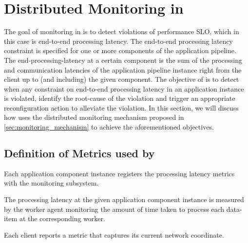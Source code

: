 \section{Distributed Monitoring in \oneedge{}}
\label{sec:oneedge_dist_mon}
The goal of monitoring in \oneedge{} is to detect violations of performance SLO, which in this case is end-to-end processing latency. The end-to-end processing latency constraint is specified for one or more components of the application pipeline. The end-processing-latency at a certain component is the sum of the processing and communication latencies of the application pipeline instance right from the client up to (and including) the given component. The objective of \oneedge{} is to detect when any constraint on end-to-end processing latency in an application instance is violated, identify the root-cause of the violation and trigger an appropriate reconfiguration action to alleviate the violation. In this section, we will discuss how \oneedge{} uses the distributed monitoring mechanism proposed in \cref{sec:monitoring_mechanism} to achieve the aforementioned objectives.

\subsection{Definition of Metrics used by \oneedge{}}
Each application component instance registers the processing latency metrics with the monitoring subsystem. 

The processing latency at the given application component instance is measured by the worker agent monitoring the amount of time taken to process each data-item at the corresponding worker.

\par \noindent Each client reports a metric that captures its current network coordinate.

